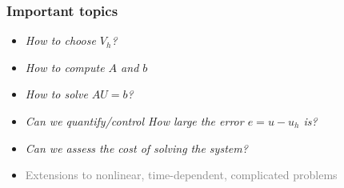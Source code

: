 \begin{frame}
  \frametitle{Important topics}

  \begin{itemize}
  \item
    \emph{How to choose $V_h$?}
  \item
    \emph{How to compute $A$ and $b$}
  \item
    \emph{How to solve $AU = b$?}
  \item
    \emph{Can we quantify/control How large the error $e = u - u_h$ is?}
  \item
    \emph{Can we assess the cost of solving the system?}
  \item
    \textcolor{grey}{Extensions to nonlinear, time-dependent, complicated problems}
  \end{itemize}

\end{frame}

